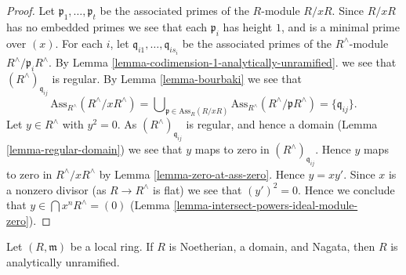 \begin{proof}
Let $\mathfrak p_1, \ldots, \mathfrak p_t$ be the associated primes
of the $R$-module $R/xR$. Since $R/xR$ has no embedded primes we
see that each $\mathfrak p_i$ has height $1$, and is a minimal
prime over $(x)$.
For each $i$, let $\mathfrak q_{i1}, \ldots, \mathfrak q_{is_i}$
be the associated primes of the $R^\wedge$-module
$R^\wedge/\mathfrak p_iR^\wedge$.
By Lemma \ref{lemma-codimension-1-analytically-unramified}.
we see that $(R^\wedge)_{\mathfrak q_{ij}}$ is regular.
By Lemma \ref{lemma-bourbaki} we see that
$$
\text{Ass}_{R^\wedge}(R^\wedge/xR^\wedge)
=
\bigcup\nolimits_{\mathfrak p \in \text{Ass}_R(R/xR)}
\text{Ass}_{R^\wedge}(R^\wedge/\mathfrak pR^\wedge)
=
\{\mathfrak q_{ij}\}.
$$
Let $y \in R^\wedge$ with $y^2 = 0$.
As $(R^\wedge)_{\mathfrak q_{ij}}$ is regular, and hence a domain
(Lemma \ref{lemma-regular-domain})
we see that $y$ maps to zero in $(R^\wedge)_{\mathfrak q_{ij}}$.
Hence $y$ maps to zero in $R^\wedge/xR^\wedge$ by
Lemma \ref{lemma-zero-at-ass-zero}.
Hence $y = xy'$. Since $x$ is a nonzero divisor (as $R \to R^\wedge$ is flat)
we see that $(y')^2 = 0$. Hence we conclude that
$y \in \bigcap x^nR^\wedge = (0)$
(Lemma \ref{lemma-intersect-powers-ideal-module-zero}).
\end{proof}

\begin{lemma}
\label{lemma-local-nagata-domain-analytically-unramified}
Let $(R, \mathfrak m)$ be a local ring.
If $R$ is Noetherian, a domain, and Nagata, then $R$ is
analytically unramified.
\end{lemma}

